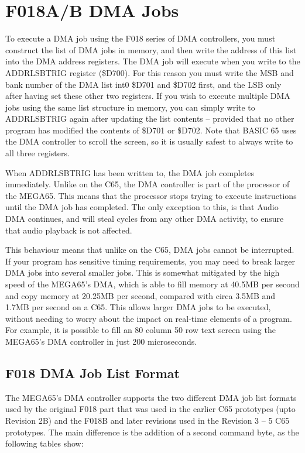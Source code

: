 \section{F018A/B DMA Jobs}

To execute a DMA job using the F018 series of DMA controllers, you must construct the list of DMA jobs in memory,
and then write the address of this list into the DMA address registers.  The DMA job will execute when you write to
the ADDRLSBTRIG register (\$D700).  For this reason you must write the MSB and bank number of the DMA list int0 \$D701 and \$D702 first,
and the LSB only after having set these other two registers.  If you wish to execute multiple DMA jobs using the same
list structure in memory, you can simply write to ADDRLSBTRIG again after updating the list contents -- provided that
no other program has modified the contents of \$D701 or \$D702.  Note that BASIC 65 uses the DMA controller to
scroll the screen, so it is usually safest to always write to all three registers.

When ADDRLSBTRIG has been written to, the DMA job completes immediately.  Unlike on the C65, the DMA controller is part
of the processor of the MEGA65. This means that the processor stops trying to execute instructions until the DMA job
has completed.  The only exception to this, is that Audio DMA continues, and will steal cycles from any other DMA activity,
to ensure that audio playback is not affected.

This behaviour means that unlike on the C65, DMA jobs cannot be interrupted. If your program has sensitive timing
requirements, you may need to break larger DMA jobs into several smaller jobs.  This is somewhat mitigated by the high
speed of the MEGA65's DMA, which is able to fill memory at 40.5MB per second and copy memory at 20.25MB per second, compared
with circa 3.5MB and 1.7MB per second on a C65. This allows larger DMA jobs to be executed, without needing to worry about
the impact on real-time elements of a program. For example, it is possible to fill an 80 column 50 row text screen using the
MEGA65's DMA controller in just 200 microseconds.

\subsection{F018 DMA Job List Format}

The MEGA65's DMA controller supports the two different DMA job list formats used by the original F018 part that
was used in the earlier C65 prototypes (upto Revision 2B) and the F018B and later revisions used in the Revision 3 -- 5
C65 prototypes.  The main difference is the addition of a second command byte, as the following tables show:


